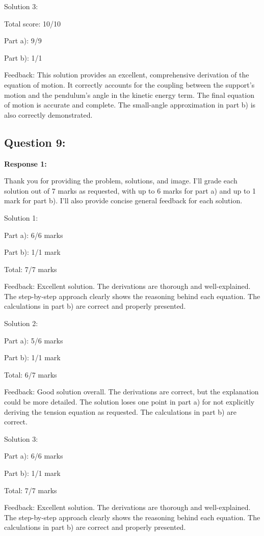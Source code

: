 \documentclass[a4paper,11pt]{article}
\begin{document}
Solution 3:

Total score: 10/10

Part a): 9/9

Part b): 1/1

Feedback: This solution provides an excellent, comprehensive derivation of the equation of motion. It correctly accounts for the coupling between the support's motion and the pendulum's angle in the kinetic energy term. The final equation of motion is accurate and complete. The small-angle approximation in part b) is also correctly demonstrated.

\subsection*{Question 9:}

\textbf{Response 1:}

Thank you for providing the problem, solutions, and image. I'll grade each solution out of 7 marks as requested, with up to 6 marks for part a) and up to 1 mark for part b). I'll also provide concise general feedback for each solution.

Solution 1:

Part a): 6/6 marks

Part b): 1/1 mark

Total: 7/7 marks

Feedback: Excellent solution. The derivations are thorough and well-explained. The step-by-step approach clearly shows the reasoning behind each equation. The calculations in part b) are correct and properly presented.

Solution 2:

Part a): 5/6 marks

Part b): 1/1 mark

Total: 6/7 marks

Feedback: Good solution overall. The derivations are correct, but the explanation could be more detailed. The solution loses one point in part a) for not explicitly deriving the tension equation as requested. The calculations in part b) are correct.

Solution 3:

Part a): 6/6 marks

Part b): 1/1 mark

Total: 7/7 marks

Feedback: Excellent solution. The derivations are thorough and well-explained. The step-by-step approach clearly shows the reasoning behind each equation. The calculations in part b) are correct and properly presented.
\end{document}
